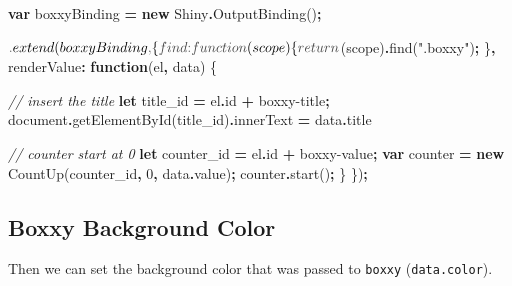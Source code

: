 \documentclass[
]{krantz}
\makeatletter
\newenvironment{Shaded}{\begin{snugshade}}{\end{snugshade}}
\newcommand{\AttributeTok}[1]{\textcolor[rgb]{0.61,0.61,0.61}{#1}}
\newcommand{\BuiltInTok}[1]{#1}
\newcommand{\CommentTok}[1]{\textcolor[rgb]{0.37,0.37,0.37}{\textit{#1}}}
\newcommand{\ControlFlowTok}[1]{\textcolor[rgb]{0.27,0.27,0.27}{\textbf{#1}}}
\newcommand{\DataTypeTok}[1]{\textcolor[rgb]{0.27,0.27,0.27}{#1}}
\newcommand{\DecValTok}[1]{\textcolor[rgb]{0.06,0.06,0.06}{#1}}
\newcommand{\FunctionTok}[1]{\textcolor[rgb]{0,0,0}{#1}}
\newcommand{\KeywordTok}[1]{\textcolor[rgb]{0.27,0.27,0.27}{\textbf{#1}}}
\newcommand{\NormalTok}[1]{#1}
\newcommand{\OperatorTok}[1]{\textcolor[rgb]{0.43,0.43,0.43}{\textbf{#1}}}
\newcommand{\StringTok}[1]{\textcolor[rgb]{0.5,0.5,0.5}{#1}}
\newenvironment{kframe}{%
\medskip{}
\setlength{\fboxsep}{.8em}
 \def\at@end@of@kframe{}%
 \ifinner\ifhmode%
  \def\at@end@of@kframe{\end{minipage}}%
  \begin{minipage}{\columnwidth}%
 \fi\fi%
 \def\FrameCommand##1{\hskip\@totalleftmargin \hskip-\fboxsep
 \colorbox{shadecolor}{##1}\hskip-\fboxsep
     \hskip-\linewidth \hskip-\@totalleftmargin \hskip\columnwidth}%
 \MakeFramed {\advance\hsize-\width
   \@totalleftmargin\z@ \linewidth\hsize
   \@setminipage}}%
 {\par\unskip\endMakeFramed%
 \at@end@of@kframe}
\renewenvironment{Shaded}{\begin{kframe}}{\end{kframe}}
\makeatother
\begin{document}
\begin{Shaded}
\begin{Highlighting}[]
\KeywordTok{var}\NormalTok{ boxxyBinding }\OperatorTok{=} \KeywordTok{new}\NormalTok{ Shiny}\OperatorTok{.}\FunctionTok{OutputBinding}\NormalTok{()}\OperatorTok{;}

\NormalTok{$}\OperatorTok{.}\FunctionTok{extend}\NormalTok{(boxxyBinding}\OperatorTok{,}\NormalTok{ \{}
  \DataTypeTok{find}\OperatorTok{:} \KeywordTok{function}\NormalTok{(scope) \{}
    \ControlFlowTok{return}\NormalTok{ $(scope)}\OperatorTok{.}\FunctionTok{find}\NormalTok{(}\StringTok{".boxxy"}\NormalTok{)}\OperatorTok{;}
\NormalTok{  \}}\OperatorTok{,}
  \DataTypeTok{renderValue}\OperatorTok{:} \KeywordTok{function}\NormalTok{(el}\OperatorTok{,}\NormalTok{ data) \{}

    \CommentTok{// insert the title}
    \KeywordTok{let}\NormalTok{ title\_id }\OperatorTok{=}\NormalTok{ el}\OperatorTok{.}\AttributeTok{id} \OperatorTok{+} \StringTok{\textquotesingle{}{-}boxxy{-}title\textquotesingle{}}\OperatorTok{;}
    \BuiltInTok{document}\OperatorTok{.}\FunctionTok{getElementById}\NormalTok{(title\_id)}\OperatorTok{.}\AttributeTok{innerText} \OperatorTok{=}\NormalTok{ data}\OperatorTok{.}\AttributeTok{title}

    \CommentTok{// counter start at 0}
    \KeywordTok{let}\NormalTok{ counter\_id }\OperatorTok{=}\NormalTok{ el}\OperatorTok{.}\AttributeTok{id} \OperatorTok{+} \StringTok{\textquotesingle{}{-}boxxy{-}value\textquotesingle{}}\OperatorTok{;}
    \KeywordTok{var}\NormalTok{ counter }\OperatorTok{=} \KeywordTok{new}\NormalTok{ CountUp(counter\_id}\OperatorTok{,} \DecValTok{0}\OperatorTok{,}\NormalTok{ data}\OperatorTok{.}\AttributeTok{value}\NormalTok{)}\OperatorTok{;}
\NormalTok{    counter}\OperatorTok{.}\FunctionTok{start}\NormalTok{()}\OperatorTok{;}
\NormalTok{  \}}
\NormalTok{\})}\OperatorTok{;}
\end{Highlighting}
\end{Shaded}

\hypertarget{shiny-output-boxxy-bg-color}{%
\subsection{Boxxy Background Color}\label{shiny-output-boxxy-bg-color}}

Then we can set the background color that was passed to \texttt{boxxy} (\texttt{data.color}).
\end{document}
